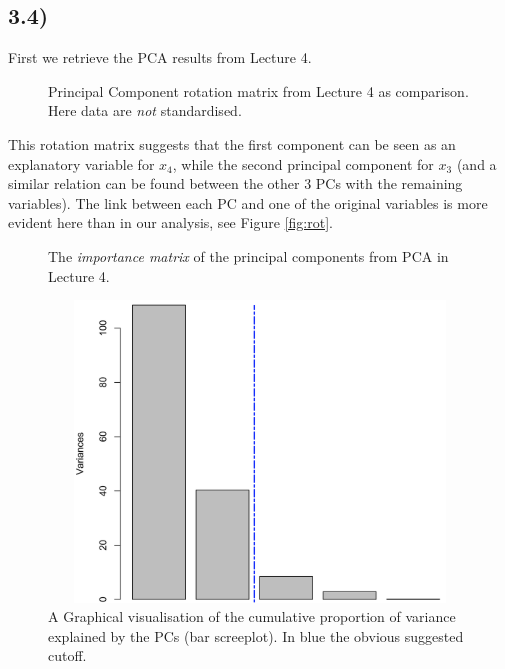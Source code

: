 \documentclass[a4paper,11pt,oneside]{report}
\begin{document}
\subsection*{3.4)}
	First we retrieve the PCA results from Lecture 4.
	\begin{figure}[H]
	\centering
	\begin{varwidth}{\linewidth}
	
	\end{varwidth}	\caption{Principal Component rotation matrix from Lecture 4 as comparison. Here data are \textit{not} standardised.}
	\end{figure}
	This rotation matrix suggests that the first component can be seen as an explanatory variable for $x_4$, while the second principal component for $x_3$ (and a similar relation can be found between the other 3 PCs with the remaining variables). The link between each PC and one of the original variables is more evident here than in our analysis, see Figure \ref{fig:rot}.
	\begin{figure}[H]
	\centering
	\begin{varwidth}{\linewidth}
	
	\end{varwidth}
	\caption{The \textit{importance matrix} of the principal components from PCA in Lecture 4.}
	\label{img:importance_4}
	\end{figure}
	\begin{figure}[H]
	\centering
	\includegraphics[height = 8cm, width = 13cm]{screeplot_bar_De_Blasi.png}
	\caption{A Graphical visualisation of the cumulative proportion of variance explained by the PCs (bar screeplot). In blue the obvious suggested cutoff.}
	\end{figure}
	
\end{document}
